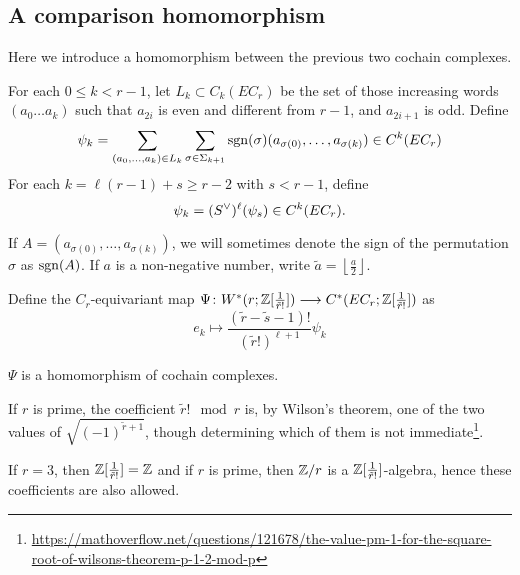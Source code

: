 \subsection{A comparison homomorphism} Here we introduce a homomorphism between the previous two cochain complexes.

\begin{definition} For each $0\leq k<r-1$, let $L_k\subset C_k(EC_r)$ be the set of those increasing words $(a_0\ldots a_k)$ such that $a_{2i}$ is even and different from $r-1$, and $a_{2i+1}$ is odd. Define
\begin{equation}\label{eq:111}
	\psi_k = \sum_{(a_0,\ldots,a_k)\in L_k}\sum_{\sigma\in \Sigma_{k+1}} \operatorname*{sgn}(\sigma)(a_{\sigma(0)},\ldots,a_{\sigma(k)})\in C^k(EC_r)
\end{equation}
For each $k = \ell (r-1) + s\geq r-2$ with $s<r-1$, define
\begin{equation}\label{eq:112}
	\psi_{k} = ({S}^{\vee})^\ell(\psi_s)\in C^k(EC_r).
\end{equation}
\end{definition}
\begin{notation} If $A= (a_{\sigma(0)},\ldots,a_{\sigma(k)})$, we will sometimes denote the sign of the permutation $\sigma$ as $\operatorname*{sgn}(A)$. If $a$ is a non-negative number, write $\tilde{a} = \left\lfloor \frac{a}{2}\right\rfloor$.
\end{notation}
Define the $C_r$-equivariant map $\Psi\colon W^*(r;\mathbb{Z}[\frac{1}{\tilde{r}!}])\longrightarrow C^*(EC_r; \mathbb{Z}[\frac{1}{\tilde{r}!}])$ as
\[e_k\mapsto \frac{(\tilde{r}-\tilde{s}-1)!}{(\tilde{r}!)^{\ell+1}}\psi_k\]



\begin{theorem}
$\Psi$ is a homomorphism of cochain complexes.
\end{theorem}
\begin{remark} If $r$ is prime, the coefficient $\tilde{r}!\mod r$ is, by Wilson's theorem, one of the two values of $\sqrt{(-1)^{\tilde{r}+1}}$, though determining which of them is not immediate\footnote{\url{https://mathoverflow.net/questions/121678/the-value-pm-1-for-the-square-root-of-wilsons-theorem-p-1-2-mod-p}}.
\end{remark}
\begin{remark} If $r=3$, then $\mathbb{Z}[\frac{1}{\tilde{r}!}] = \mathbb{Z}$ and if $r$ is prime, then $\mathbb{Z}/r$ is a $\mathbb{Z}[\frac{1}{\tilde{r}!}]$-algebra, hence these coefficients are also allowed.
\end{remark}

